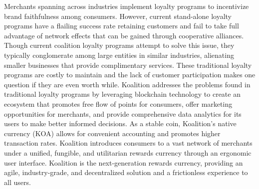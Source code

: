 Merchants spanning across industries implement loyalty programs to incentivize brand faithfulness among consumers. However, current stand-alone loyalty programs have a flailing success rate retaining customers and fail to take full advantage of network effects that can be gained through cooperative alliances. Though current coalition loyalty programs attempt to solve this issue, they typically conglomerate among large entities in similar industries, alienating smaller businesses that provide complimentary services. These traditional loyalty programs are costly to maintain and the lack of customer participation makes one question if they are even worth while. Koalition addresses the problems found in traditional loyalty programs by leveraging blockchain technology to create an ecosystem that promotes free flow of points for consumers, offer marketing opportunities for merchants, and provide comprehensive data analytics for its users to make better informed decisions. As a stable coin, Koalition's native currency (KOA) allows for convenient accounting and promotes higher transaction rates. Koalition introduces consumers to a vast network of merchants under a unified, fungible, and utilitarian rewards currency through an ergonomic user interface. Koalition is the next-generation rewards currency, providing an agile, industry-grade, and decentralized solution and a frictionless experience to all users.